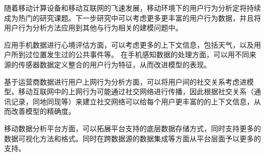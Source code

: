 随着移动计算设备和移动互联网的飞速发展，移动环境下的用户行为分析定将持续成为热门的研究课题。下一步研究中可以考虑更多更丰富的用户行为数据，并且将用户行为分析方法应用到其他与行为相关的建模问题中。

应用手机数据进行心境评估方面，可以考虑更多的上下文信息，包括天气，以及用户所到过位置发生过的公共事件等。 在手机感知数据的处理方面，可以用不同来源的传感器数据定义整合的用户行为特征，从而改进模型的表现。

基于运营商数据进行用户上网行为分析方面，可以将用户间的社交关系考虑进模型。移动互联网中的上网行为可能通过社交网络进行传播，因此根据社交关系（通讯记录，同地同现等）来建立社交网络可以给每个用户更丰富的的上下文信息，从而改善模型的精确度。

移动数据分析平台方面，可以拓展平台支持的底层数据存储方式，同时支持更多的数据可视化方法和格式。同时在跨数据源的数据集成等方面从平台层面予以更多的支持。

